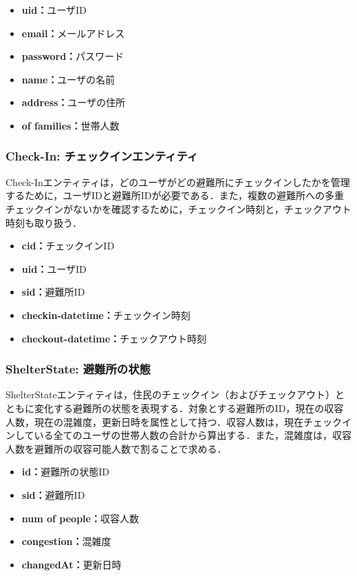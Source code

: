 \documentclass[technicalreport,dvipdfmx]{ieicej}
\begin{document}
\begin{itemize}
    \item{\textbf{uid：}}ユーザID
    \item{\textbf{email：}}メールアドレス
    \item{\textbf{password：}}パスワード
    \item{\textbf{name：}}ユーザの名前
    \item{\textbf{address：}}ユーザの住所
    \item{\textbf{of families：}}世帯人数
\end{itemize}

\subsubsection{{\bf Check-In:} チェックインエンティティ}
Check-Inエンティティは，どのユーザがどの避難所にチェックインしたかを管理するために，ユーザIDと避難所IDが必要である．また，複数の避難所への多重チェックインがないかを確認するために，チェックイン時刻と，チェックアウト時刻も取り扱う．%

\begin{itemize}
    \item{\textbf{cid：}}チェックインID
    \item{\textbf{uid：}}ユーザID
    \item{\textbf{sid：}}避難所ID
    \item{\textbf{checkin-datetime：}}チェックイン時刻
    \item{\textbf{checkout-datetime：}}チェックアウト時刻
\end{itemize}

\subsubsection{{\bf ShelterState:} 避難所の状態}
ShelterStateエンティティは，住民のチェックイン（およびチェックアウト）とともに変化する避難所の状態を表現する．対象とする避難所のID，現在の収容人数，現在の混雑度，更新日時を属性として持つ．収容人数は，現在チェックインしている全てのユーザの世帯人数の合計から算出する．また，混雑度は，収容人数を避難所の収容可能人数で割ることで求める．

\begin{itemize}
     \item{\textbf{id：}}避難所の状態ID
     \item{\textbf{sid：}}避難所ID
     \item{\textbf{num of people：}}収容人数
     \item{\textbf{congestion：}}混雑度
     \item{\textbf{changedAt：}}更新日時
 \end{itemize}
\end{document}
